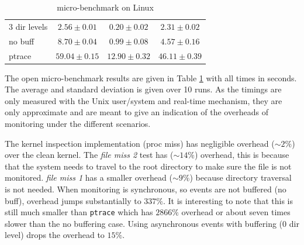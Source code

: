 \begin{table}
\begin{tabular}{ | l || c | c | c | }
3 dir levels & \begin{math} 2.56\pm0.01 \end{math} & \begin{math} 0.20\pm0.02 \end{math} & \begin{math} 2.31\pm0.02 \end{math} \\
no buff & \begin{math} 8.70\pm0.04 \end{math} & \begin{math} 0.99\pm0.08 \end{math} & \begin{math} 4.57\pm0.16 \end{math} \\
ptrace & \begin{math} 59.04\pm0.15 \end{math} & \begin{math} 12.90\pm0.32 \end{math} & \begin{math} 46.11\pm0.39 \end{math} \\
\hline
\end{tabular}
\caption{ micro-benchmark on Linux}
\label{tab:lbox-open}
\end{table}

The open micro-benchmark results are given in Table \ref{tab:lbox-open}
with all times in seconds. The average and standard deviation
is given over 10 runs.
As the timings are only measured with the Unix user/system and real-time
mechanism, they are only approximate and are meant
to give an indication of the overheads of monitoring
under the different scenarios.

The kernel inspection implementation (proc miss) has negligible overhead
($\sim 2\%$) over the clean kernel.
The {\em file miss 2} test has ($\sim 14\%$) overhead, this is because that
the system needs to travel to the root directory to make sure the file is
not monitored.
{\em file miss 1} has a smaller overhead ($\sim 9\%$) because directory
traversal is not needed.
When monitoring is synchronous, so events are not buffered (no buff),
overhead jumps substantially to $337\%$.
It is interesting to note that this is still much smaller than {\tt ptrace}
which has $2866\%$ overhead or about seven times slower than the
no buffering case.
Using asynchronous events with buffering (0 dir level) 
drops the overhead to $15\%$.


